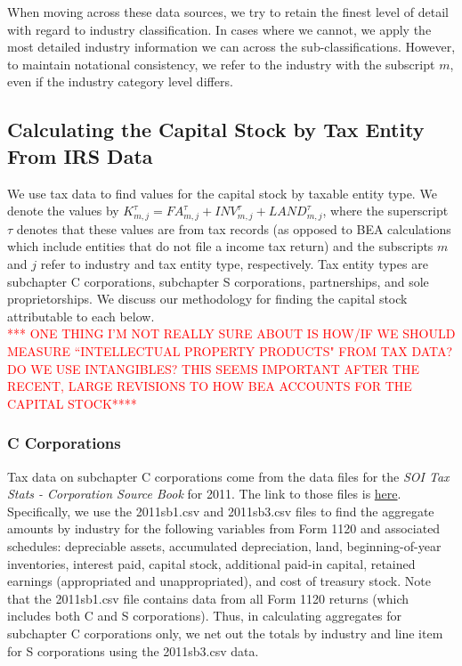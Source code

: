 \documentclass[article,11pt,letterpaper,fleqn]{article}
\theoremstyle{definition}
\numberwithin{equation}{section}
\begin{document}
When moving across these data sources, we try to retain the finest level of detail with regard to industry classification.  In cases where we cannot, we apply the most detailed industry information we can across the sub-classifications.  However, to maintain notational consistency, we refer to the industry with the subscript $m$, even if the industry category level differs.


\subsection{Calculating the Capital Stock by Tax Entity From IRS Data}

We use tax data to find values for the capital stock by taxable entity type.  We denote the values by $K^{\tau}_{m,j}={FA}^{\tau}_{m,j}+{INV}^{\tau}_{m,j}+{LAND}^{\tau}_{m,j}$, where the superscript $\tau$ denotes that these values are from tax records (as opposed to BEA calculations which include entities that do not file a income tax return) and the subscripts $m$ and $j$ refer to industry and tax entity type, respectively.  Tax entity types are subchapter C corporations, subchapter S corporations, partnerships, and sole proprietorships.  We discuss our methodology for finding the capital stock attributable to each below.
\ \\
\textcolor{red}{*** ONE THING I'M NOT REALLY SURE ABOUT IS HOW/IF WE SHOULD MEASURE ``INTELLECTUAL PROPERTY PRODUCTS" FROM TAX DATA?  DO WE USE INTANGIBLES?  THIS SEEMS IMPORTANT AFTER THE RECENT, LARGE REVISIONS TO HOW BEA ACCOUNTS FOR THE CAPITAL STOCK****}


\subsubsection{C Corporations}

Tax data on subchapter C corporations come from the data files for the \emph{SOI Tax Stats - Corporation Source Book} for 2011.  The link to those files is \href{http://www.irs.gov/uac/SOI-Tax-Stats-Corporation-Source-Book:-Data-File}{here}.  Specifically, we use the 2011sb1.csv and 2011sb3.csv files to find the aggregate amounts by industry for the following variables from Form 1120 and associated schedules: depreciable assets, accumulated depreciation, land, beginning-of-year inventories, interest paid, capital stock, additional paid-in capital, retained earnings (appropriated and unappropriated), and cost of treasury stock.  Note that the 2011sb1.csv file contains data from all Form 1120 returns (which includes both C and S corporations).  Thus, in calculating aggregates for subchapter C corporations only, we net out the totals by industry and line item for S corporations using the 2011sb3.csv data.
\end{document}
